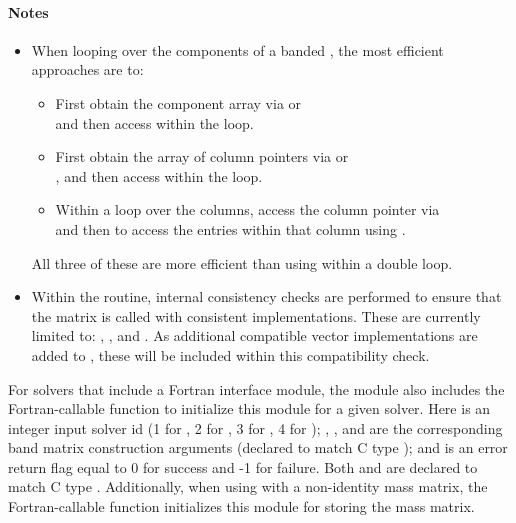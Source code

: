 \paragraph{\bf Notes}                                                      
           
\begin{itemize}
                                        
\item
  When looping over the components of a banded  ,
  the most efficient approaches are to:
  \begin{itemize}
    \item First obtain the component array via  or\\
     and then
    access  within the loop.
  
    \item First obtain the array of column pointers via  or\\
    , and then
    access  within the loop. 
  
    \item Within a loop over the columns, access the column pointer via\\
     and then to access the
    entries within that column using .
  \end{itemize}
  All three of these are more efficient than
  using  within a double loop.

\item
  {\warn} Within the  routine, internal
  consistency checks are performed to ensure that the matrix is called
  with consistent {\nvector} implementations.  These are currently
  limited to: {\nvecs}, {\nvecopenmp}, and {\nvecpthreads}.  As additional
  compatible vector implementations are added to {\sundials}, these
  will be included within this compatibility check.

\end{itemize}

For solvers that include a Fortran interface module, the {\sunmatband}
module also includes the Fortran-callable
function  to initialize
this {\sunmatband} module for a given {\sundials} solver.
Here  is an integer input solver id (1 for {\cvode}, 2 for {\ida}, 3
for {\kinsol}, 4 for {\arkode}); , ,  and 
are the corresponding band matrix construction arguments (declared 
to match C type ); and  is an error return flag
equal to 0 for success and -1 for failure. Both  and 
are declared to match C type . Additionally, when using
{\arkode} with a non-identity mass matrix, the Fortran-callable
function  initializes
this {\sunmatband} module for storing the mass matrix.
